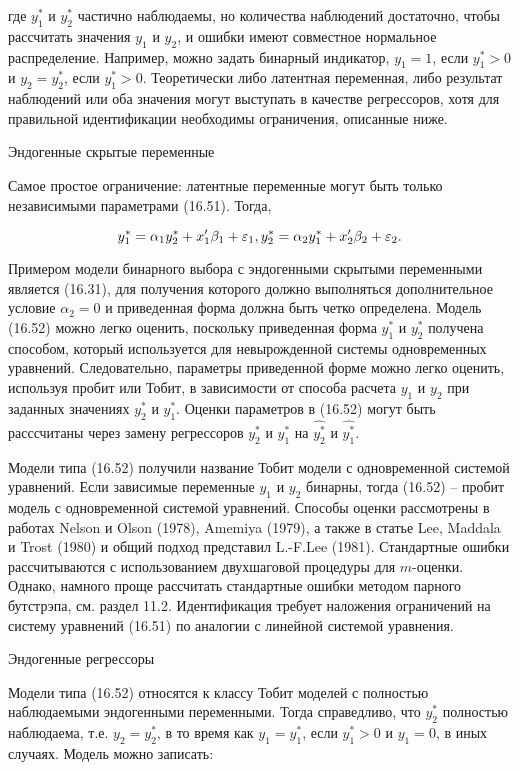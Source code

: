 где $y_1^{*}$ и $y_2^{*}$ частично наблюдаемы, но количества наблюдений достаточно, чтобы рассчитать значения $y_1$ и $y_2$, и ошибки имеют совместное нормальное распределение. Например, можно задать бинарный индикатор, $y_1=1$, если $y_1^{*}>0$ и $y_2=y_2^{*}$, если $y_1^{*}>0$. Теоретически либо латентная переменная, либо результат наблюдений или оба значения могут выступать в качестве регрессоров, хотя для правильной идентификации необходимы ограничения, описанные ниже.

Эндогенные скрытые переменные


Самое простое ограничение: латентные переменные могут быть только независимыми параметрами (16.51). Тогда,

\begin{equation}
y_1^{*}=\alpha_{1}y_2^{*}+x_1'\beta_1+\varepsilon_1,\\
y_2^{*}=\alpha_{2}y_1^{*}+x_2'\beta_2+\varepsilon_2.
\end{equation}

Примером модели бинарного выбора с эндогенными скрытыми переменными является (16.31), для получения которого должно выполняться дополнительное условие $\alpha_2=0$ и приведенная форма должна быть четко определена. Модель (16.52) можно легко оценить, поскольку приведенная форма $y_1^{*}$ и $y_2^{*}$ получена способом, который используется для невырожденной системы одновременных уравнений. Следовательно, параметры приведенной форме можно легко оценить, используя пробит или Тобит, в зависимости от способа расчета $y_1$ и $y_2$ при заданных значениях $y_2^{*}$ и $y_1^{*}$. Оценки параметров в (16.52) могут быть расссчитаны через замену регрессоров $y_2^{*}$ и $y_1^{*}$ на $\hat{y_2^{*}}$ и $\hat{y_1^{*}}$. 

Модели типа (16.52) получили название Тобит модели с одновременной системой уравнений. Если зависимые переменные $y_1$ и $y_2$ бинарны, тогда (16.52) -- пробит модель с одновременной системой уравнений. Способы оценки рассмотрены в работах Nelson и Olson (1978), Amemiya (1979), а также в статье Lee, Maddala и Trost (1980) и общий подход представил L.-F.Lee (1981). Стандартные ошибки рассчитываются с использованием двухшаговой процедуры для $m$-оценки. Однако, намного проще рассчитать стандартные ошибки методом парного бутстрэпа, см. раздел 11.2. Идентификация требует наложения ограничений на систему уравнений (16.51) по аналогии с линейной системой уравнения.

Эндогенные регрессоры

Модели типа (16.52) относятся к классу Тобит моделей с полностью наблюдаемыми эндогенными переменными. Тогда справедливо, что $y_2^{*}$ полностью наблюдаема, т.е. $y_2=y_2^{*}$, в то время как $y_1=y_1^{*}$, если $y_1^{*}>0$ и $y_1=0$, в иных случаях. Модель можно записать:

